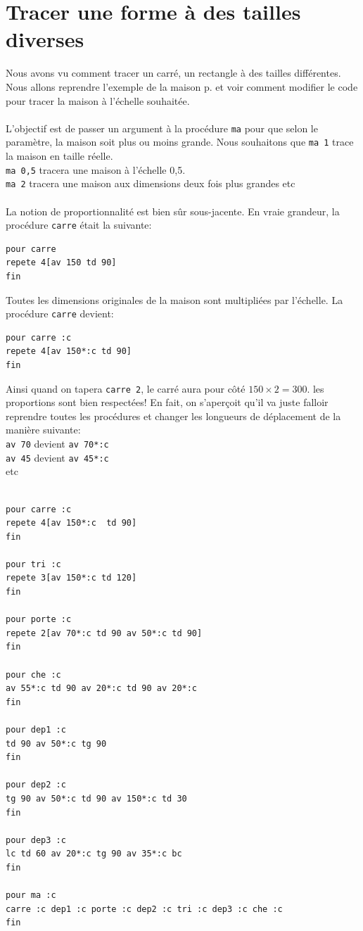 \section{Tracer une forme à des tailles diverses}
\noindent
Nous avons vu comment tracer un carré, un rectangle à des tailles différentes. Nous allons reprendre l'exemple de la maison p. \pageref{maison} et voir comment modifier le code pour tracer la maison à l'échelle souhaitée.\\ \\
L'objectif est de passer un argument à la procédure \texttt{ma} pour que selon le paramètre, la maison soit plus ou moins grande. Nous souhaitons que \texttt{ma 1} trace la maison en taille réelle.\\
\texttt{ma 0,5} tracera une maison à l'échelle 0,5. \\
\texttt{ma 2} tracera une maison aux dimensions deux fois plus grandes etc \\ \\
La notion de proportionnalité est bien sûr sous-jacente. En vraie grandeur, la procédure \texttt{carre} était la suivante:
\begin{verbatim}
pour carre 
repete 4[av 150 td 90]
fin
\end{verbatim}
Toutes les dimensions originales de la maison sont multipliées par l'échelle. La procédure \texttt{carre} devient: 
\begin{verbatim}
pour carre :c
repete 4[av 150*:c td 90]
fin
\end{verbatim}
Ainsi quand on tapera \texttt{carre 2}, le carré aura pour côté $150\times2=300$. les proportions sont bien respectées! En fait, on s'aperçoit qu'il va juste falloir reprendre toutes les procédures et changer les longueurs de déplacement de la manière suivante: \\
\texttt{av 70} devient \texttt{av 70*:c} \\ 
\texttt{av 45} devient \texttt{av 45*:c} \\
etc\\ \\
\begin{verbatim}
pour carre :c
repete 4[av 150*:c  td 90]
fin

pour tri :c
repete 3[av 150*:c td 120]
fin

pour porte :c
repete 2[av 70*:c td 90 av 50*:c td 90]
fin

pour che :c
av 55*:c td 90 av 20*:c td 90 av 20*:c
fin

pour dep1 :c
td 90 av 50*:c tg 90
fin

pour dep2 :c
tg 90 av 50*:c td 90 av 150*:c td 30
fin

pour dep3 :c
lc td 60 av 20*:c tg 90 av 35*:c bc
fin

pour ma :c
carre :c dep1 :c porte :c dep2 :c tri :c dep3 :c che :c
fin
\end{verbatim}
